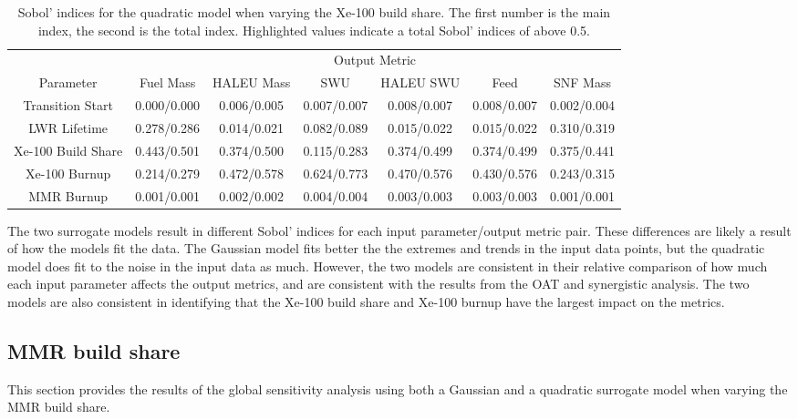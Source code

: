 \begin{table}[h!]
    \centering
    \caption{Sobol' indices for the quadratic model when varying the Xe-100 
    build share. The first number is the main index, the second is the total 
    index. Highlighted 
    values indicate a total Sobol' indices of above 0.5.}
    \label{tab:s7_sobol_xe100_quadratic}
    \begin{tabular}{c c c c c c c}
        \hline
        & \multicolumn{6}{c}{Output Metric} \\
        Parameter & Fuel Mass & HALEU Mass & SWU & HALEU SWU & Feed & SNF Mass \\
        \hline
        Transition Start & 0.000/0.000& 0.006/0.005 & 0.007/0.007 &
                           0.008/0.007 & 0.008/0.007 & 0.002/0.004\\
        LWR Lifetime & 0.278/0.286 & 0.014/0.021 & 0.082/0.089 & 
                       0.015/0.022 & 0.015/0.022 & 0.310/0.319\\
        Xe-100 Build Share & \cellcolor{green!25}0.443/0.501 & \cellcolor{green!25}0.374/0.500 & 0.115/0.283 & 
                             0.374/0.499 & 0.374/0.499 & 0.375/0.441\\
        Xe-100 Burnup & 0.214/0.279 & \cellcolor{green!25}0.472/0.578 & \cellcolor{green!25}0.624/0.773 &
                        \cellcolor{green!25}0.470/0.576 & \cellcolor{green!25}0.430/0.576 & 0.243/0.315\\
        MMR Burnup & 0.001/0.001 & 0.002/0.002 & 0.004/0.004 &
                     0.003/0.003 & 0.003/0.003 & 0.001/0.001\\
        \hline        
    \end{tabular}
\end{table}

The two surrogate models result in different Sobol' indices for each 
input parameter/output metric pair. These differences are likely a result 
of how the models fit the data. The Gaussian model fits 
better the the extremes and trends in the input data points, but the 
quadratic model does fit to the noise in the input data as much. 
However, the two models are consistent in 
their relative comparison of how much each input parameter affects the output 
metrics, and are consistent with the results from the \gls{OAT} and 
synergistic analysis. The two models are also consistent in 
identifying that the Xe-100 build share and Xe-100 burnup 
have the largest impact on the metrics.

\subsection{MMR build share}
This section provides the results of the global sensitivity analysis using 
both a Gaussian and a quadratic surrogate model when varying the \gls{MMR} 
build share. 

